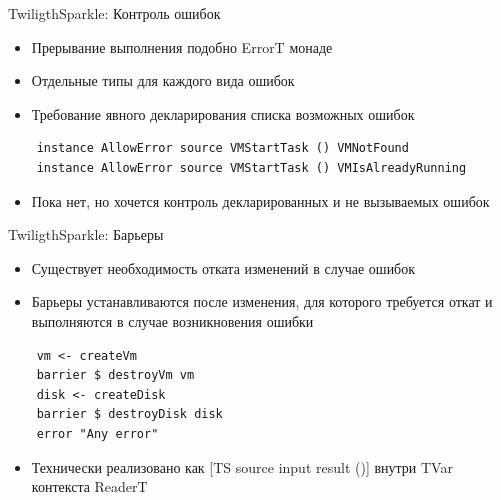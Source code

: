 \documentclass[10pt]{beamer}
\begin{document}
\begin{frame}[fragile]{TwiligthSparkle: Контроль ошибок}

  \begin{itemize}
    \item Прерывание выполнения подобно ErrorT монаде
    \item Отдельные типы для каждого вида ошибок
    \item Требование явного декларирования списка возможных ошибок
    \end{itemize}
  \begin{verbatim}
    instance AllowError source VMStartTask () VMNotFound
    instance AllowError source VMStartTask () VMIsAlreadyRunning
  \end{verbatim}
  \begin{itemize}
    \item Пока нет, но хочется контроль декларированных и не вызываемых ошибок
  \end{itemize}
\end{frame}

\begin{frame}[fragile]{TwiligthSparkle: Барьеры}

  \begin{itemize}
    \item Существует необходимость отката изменений в случае ошибок
    \item Барьеры устанавливаются после изменения, для которого требуется откат
     и выполняются в случае возникновения ошибки
  \end{itemize}
  \begin{verbatim}
    vm <- createVm
    barrier $ destroyVm vm
    disk <- createDisk
    barrier $ destroyDisk disk
    error "Any error"
  \end{verbatim}
  \begin{itemize}
    \item Технически реализовано как [TS source input result ()]
     внутри TVar контекста ReaderT
  \end{itemize}

\end{frame}
\end{document}
